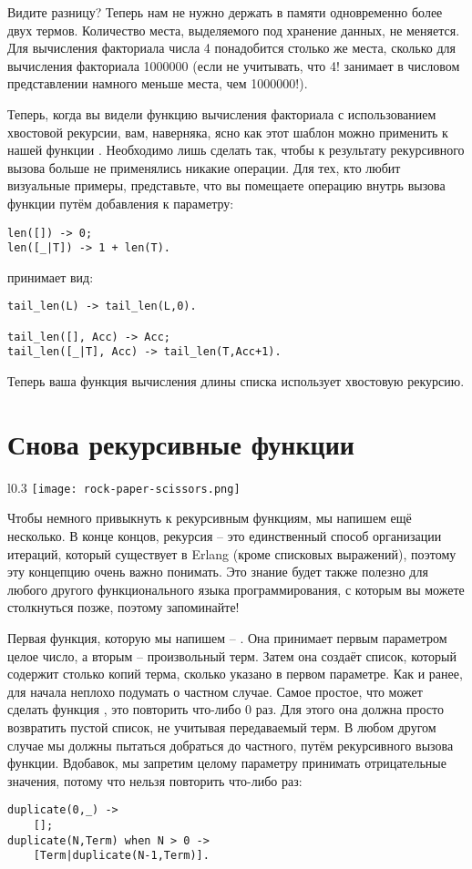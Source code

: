 Видите разницу?
Теперь нам не нужно держать в памяти одновременно более двух термов.
Количество места, выделяемого под хранение данных, не меняется.
Для вычисления факториала числа 4 понадобится столько же места, сколько для вычисления факториала 1000000 (если не учитывать, что 4! занимает в числовом представлении намного меньше места, чем 1000000!).

Теперь, когда вы видели функцию вычисления факториала с использованием хвостовой рекурсии, вам, наверняка, ясно как этот шаблон можно применить к нашей функции .
Необходимо лишь сделать так, чтобы к результату рекурсивного вызова больше не применялись никакие операции.
Для тех, кто любит визуальные примеры, представьте, что вы помещаете операцию  внутрь вызова функции путём добавления к параметру:
\begin{lstlisting}[style=erlang]
len([]) -> 0;
len([_|T]) -> 1 + len(T).
\end{lstlisting}
принимает вид:
\begin{lstlisting}[style=erlang]
tail_len(L) -> tail_len(L,0).
 
tail_len([], Acc) -> Acc;
tail_len([_|T], Acc) -> tail_len(T,Acc+1).
\end{lstlisting}

Теперь ваша функция вычисления длины списка использует хвостовую рекурсию.
\section{Снова рекурсивные функции}
\begin{wrapfigure}{l}{0.3\linewidth}
    \texttt{[image: rock-paper-scissors.png]}
\end{wrapfigure}
Чтобы немного привыкнуть к рекурсивным функциям, мы напишем ещё несколько.
В конце концов, рекурсия \--- это единственный способ организации итераций, который существует в Erlang (кроме списковых выражений), поэтому эту концепцию очень важно понимать.
Это знание будет также полезно для любого другого функционального языка программирования, с которым вы можете столкнуться позже, поэтому запоминайте!

Первая функция, которую мы напишем \--- .
Она принимает первым параметром целое число, а вторым \--- произвольный терм.
Затем она создаёт список, который содержит столько копий терма, сколько указано в первом параметре.
Как и ранее, для начала неплохо подумать о частном случае.
Самое простое, что может сделать функция , это повторить что\--либо 0 раз.
Для этого она должна просто возвратить пустой список, не учитывая передаваемый терм.
В любом другом случае мы должны пытаться добраться до частного, путём рекурсивного вызова функции.
Вдобавок, мы запретим целому параметру принимать отрицательные значения, потому что нельзя повторить что\--либо  раз:
\begin{lstlisting}[style=erlang]
duplicate(0,_) ->
    [];
duplicate(N,Term) when N > 0 ->
    [Term|duplicate(N-1,Term)].
\end{lstlisting}

